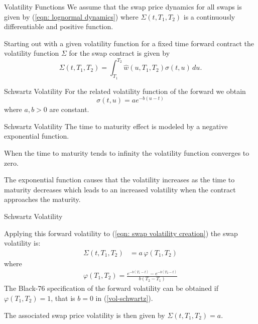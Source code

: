 


{Volatility Functions}
We assume that the swap price dynamics for all swaps is given by (\ref{eqn: lognormal dynamics})
where $\Sigma(t,T_1,T_2)$ is a continuously differentiable and positive function.

Starting out with a given volatility function for a fixed time forward contract the volatility function $\Sigma$ for the swap contract is given by
\begin{equation}
\Sigma(t,T_1,T_2)=\int_{T_1}^{T_2} \hat{w}(u,T_1,T_2) \sigma(t,u) \, du. \label{eqn: swap volatility creation}
\end{equation}

{Schwartz Volatility}
For the related volatility function of the forward we obtain
\begin{equation}\label{vol-schwartz}
\sigma(t,u)=a e^{-b(u-t)}
\end{equation}
where $a,b >0 $ are constant.

{Schwartz Volatility}
The time to maturity effect is modeled by a negative exponential function.






	When the time to maturity tends to infinity the volatility function converges to zero.

	The exponential function causes that the volatility increases as the time to maturity decreases which leads to an increased volatility when the contract approaches the maturity.






{Schwartz Volatility}

Applying this forward volatility to (\ref{eqn: swap volatility creation}) the swap volatility is:
\begin{align}
\Sigma(t,T_1,T_2)&=a\,\varphi(T_1,T_2)
\end{align}
where
\begin{align}
\varphi(T_1,T_2)= \frac{e^{-b(T_1-t)}-e^{-b(T_2-t)}}{b(T_2-T_1)}
\label{volatility function varphi}
\end{align}
The Black-76 specification of the forward volatility can be obtained if $\varphi(T_1,T_2) =1$, that is $b=0$
in (\ref{vol-schwartz}).

The associated swap price volatility is then given by $\Sigma(t,T_1,T_2)=a$.

